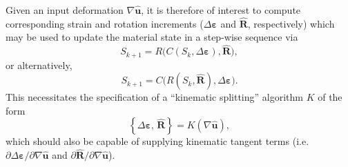 Given an input deformation $\nabla \hat{\mathbf{u}}$, it is therefore of interest to compute corresponding strain and rotation increments ($\Delta \boldsymbol{\varepsilon}$ and $\hat{\mathbf{R}}$, respectively) which may be used to update the material state in a step-wise sequence via
\begin{equation}
    S_{k+1} = R\big(C(S_k, \Delta \boldsymbol{\varepsilon}), \hat{\mathbf{R}}\big),
\end{equation}
or alternatively,
\begin{equation}
    S_{k+1} = C\big(R(S_k, \hat{\mathbf{R}}), \Delta \boldsymbol{\varepsilon}\big).
\end{equation}
This necessitates the specification of a ``kinematic splitting'' algorithm $K$ of the form
\begin{equation}
    \left\{ \Delta \boldsymbol{\varepsilon}, \, \hat{\mathbf{R}} \right\} = K(\nabla \hat{\mathbf{u}}),
\end{equation}
which should also be capable of supplying kinematic tangent terms (i.e. $\partial \Delta \boldsymbol{\varepsilon} / \partial \nabla \hat{\mathbf{u}}$ and $\partial \hat{\mathbf{R}} / \partial \nabla \hat{\mathbf{u}}$).

